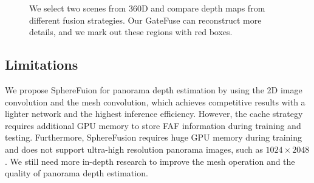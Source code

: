 \begin{figure} [h]
	\centering
	\captionsetup[subfigure]{labelformat=empty}
	
	\hspace{0.1em}
	\hspace{0.1em}
	\hspace{0.1em}
	\hspace{0.1em}
	\hspace{0.1em}
 
	\vspace{-1.0em}

	\hspace{0.1em}
	\hspace{0.1em}
	\hspace{0.1em}
	\hspace{0.1em}
	\hspace{0.1em}

    \vspace{-1.0em}

	\caption{
		We select two scenes from 360D \cite{zioulis2018omnidepth} and compare depth maps from different fusion strategies.
		Our GateFuse can reconstruct more details, and we mark out these regions with red boxes.
	}
	\label{fig:viz_fusion}

    \vspace{-1.5em}
 
\end{figure}


\subsection{Limitations}

We propose SphereFuion for panorama depth estimation by using the 2D image convolution and the mesh convolution, which achieves competitive results with a lighter network and the highest inference efficiency.
However, the cache strategy requires additional GPU memory to store FAF information during training and testing.
Furthermore, SphereFusion requires huge GPU memory during training and does not support ultra-high resolution panorama images, such as $1024 \times 2048$ \cite{rey2022360monodepth}. 
We still need more in-depth research to improve the mesh operation and the quality of panorama depth estimation. 

